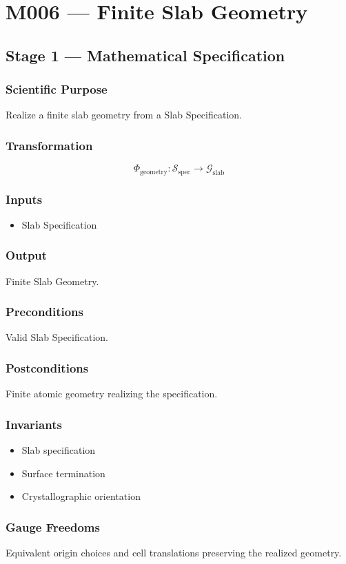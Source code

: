 \chapter{M006 --- Finite Slab Geometry}

\section{Stage 1 --- Mathematical Specification}

\subsection{Scientific Purpose}

Realize a finite slab geometry from a Slab Specification.

\subsection{Transformation}

\[
\Phi_{\mathrm{geometry}}:
\mathcal{S}_{\mathrm{spec}}
\rightarrow
\mathcal{G}_{\mathrm{slab}}
\]

\subsection{Inputs}

\begin{itemize}
\item Slab Specification
\end{itemize}

\subsection{Output}

Finite Slab Geometry.

\subsection{Preconditions}

Valid Slab Specification.

\subsection{Postconditions}

Finite atomic geometry realizing the specification.

\subsection{Invariants}

\begin{itemize}
\item Slab specification
\item Surface termination
\item Crystallographic orientation
\end{itemize}

\subsection{Gauge Freedoms}

Equivalent origin choices and cell translations preserving the realized
geometry.
